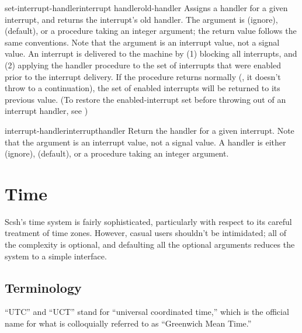 \begin{defundesc}{set-interrupt-handler}{interrupt handler}{old-handler}
Assigns a handler for a given interrupt, 
and returns the interrupt's old handler.
The  argument is  (ignore),  (default), or a
procedure taking an integer argument; 
the return value follows the same conventions.
Note that the  argument is an interrupt value, 
not a signal value.
An interrupt is delivered to the {\scm} machine by (1) blocking all interrupts,
and (2) applying the handler procedure to the set of interrupts 
that were enabled prior to the interrupt delivery.
If the procedure returns normally (\ie, it doesn't throw to a continuation), 
the set of enabled interrupts will be returned to its previous value.
(To restore the enabled-interrupt set before throwing out of an interrupt
handler, see )

\end{defundesc}

\begin{defundesc}{interrupt-handler}{interrupt}{handler}
Return the handler for a given interrupt.
Note that the argument is an interrupt value, not a signal value.
A handler is either  (ignore),  (default), or a
procedure taking an integer argument.
\end{defundesc}


\section{Time}
\label{sec:time}

Scsh's time system is fairly sophisticated, particularly with respect
to its careful treatment of time zones.
However, casual users shouldn't be intimidated;
all of the complexity is optional, 
and defaulting all the optional arguments reduces the system
to a simple interface.

\subsection{Terminology}
``UTC'' and ``UCT'' stand for ``universal coordinated time,'' which is the 
official name for what is colloquially referred to as ``Greenwich Mean
Time.''


